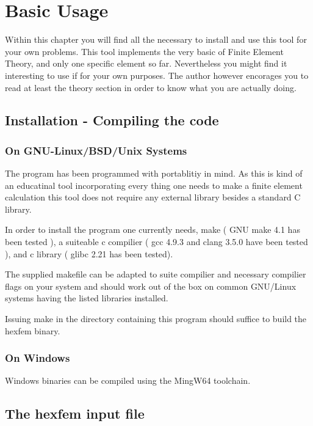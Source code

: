 \chapter{Basic Usage}

Within this chapter you will find all the necessary to install and use
this tool for your own problems. This tool implements the very basic
of Finite Element Theory, and only one specific element so
far. Nevertheless you might find it interesting to use if for your own
purposes. The author however encorages you to read at least the theory section
in order to know what you are actually doing. 

\section{Installation - Compiling the code}

\subsection{On GNU-Linux/BSD/Unix Systems}

The program has been programmed with portablitiy in mind. As this is
kind of an educatinal tool incorporating every thing one needs to make
a finite element calculation this tool does not require any external
library besides a standard C library.

In order to install the program one currently needs, make ( GNU make
4.1 has been tested ), a suiteable c compilier ( gcc 4.9.3 and clang
3.5.0 have been tested ), and c library ( glibc 2.21 has been
tested).

The supplied makefile can be adapted to suite compilier and necessary compilier
flags on your system and should work out of the box on common GNU/Linux
systems having the listed libraries installed.

Issuing make in the directory containing this program should suffice
to build the hexfem binary.

\subsection{On Windows}

Windows binaries can be compiled using the MingW64 toolchain.

\section{The hexfem input file}

